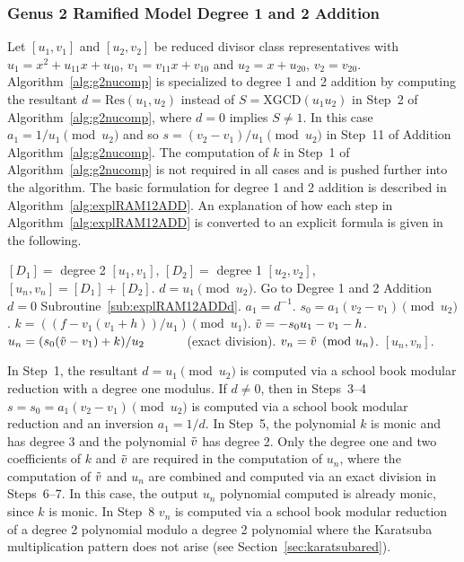 \subsubsection{Genus 2 Ramified Model Degree 1 and 2 Addition}
Let $[u_1,v_1]$ and $[u_2,v_2]$ be reduced divisor class representatives with
$u_1 = x^2 + u_{11}x + u_{10}$, $v_1 = v_{11}x + v_{10}$ and $u_2 = x + u_{20}$,
$v_2 = v_{20}$. Algorithm~\ref{alg:g2nucomp}  is specialized to
degree 1 and 2 addition by computing the resultant $d = \mathrm{Res}(u_1,u_2)$
instead of $S = \mathrm{XGCD}(u_1 u_2)$ in Step~2 of
Algorithm~\ref{alg:g2nucomp}, where $d=0$ implies $S \neq 1$. In this case $a_1
= 1/u_1 \pmod{u_2}$ and so $s = (v_2 - v_1)/u_1 \pmod{u_2}$ in Step~11 of
Addition Algorithm~\ref{alg:g2nucomp}. The computation of $k$ in Step~1 of
Algorithm~\ref{alg:g2nucomp} is not required in all cases and is pushed further
into the algorithm. The basic formulation for degree 1 and 2 addition is
described in Algorithm~\ref{alg:explRAM12ADD}. An explanation of how each step
in Algorithm~\ref{alg:explRAM12ADD} is converted to an explicit formula is given
in the following.

\begin{algorithm}[htbp]
\caption{Genus 2 Ramified Model Degree 1 and 2 Addition\label{alg:explRAM12ADD}}
\begin{algorithmic} [1]
\Require $[D_1] = $ degree 2 $[u_1,v_1]$, $[D_2] = $ degree 1 $ [u_2,v_2]$, \smallskip
\Ensure $[u_n,v_n] = [D_1] + [D_2] $.
\algrule
\State $d = u_1 \pmod{u_2}$.
 \hspace{1pt} Go to Degree 1 and 2 Addition $d=0$ Subroutine~\ref{sub:explRAM12ADDd}.
\EndIf
\State $a_1 = d^{-1}$.
\State $s_0 = a_1(v_2 - v_1) \pmod{u_2}$.
\State $k = ((f - v_1(v_1 + h))/u_1) \pmod{u_1}$.
\State $\tilde{v} = -s_0u_1 - v_1 - h$.
\State $u_n = (s_0(\tilde{v} - v_1) + k)/u_2 \quad\quad\quad$ (exact division).
\State $v_n = \tilde{v} \pmod{u_n}$.
\State \Return $[u_n,v_n]$.
\end{algorithmic}
\end{algorithm}

In Step~1, the resultant $d = u_1 \pmod{u_2}$ is computed via a school book
modular reduction with a degree one modulus. If $d \neq 0$, then in Steps~3--4
$s = s_0 = a_1(v_2 - v_1) \pmod{u_2}$ is computed via a school book modular
reduction and an inversion $a_1 = 1/d$. In Step~5, the polynomial $k$ is monic
and has degree 3 and the polynomial $\tilde{v}$ has degree 2. Only the degree one and two
coefficients of $k$ and $\tilde{v}$ are required in the computation of $u_n$, where
the computation of $\tilde{v}$ and $u_n$ are combined and computed via an exact
division in Steps~6--7. In this case, the output $u_n$ polynomial computed is
already monic, since $k$ is monic. In Step~8 $v_n$ is computed via a school book
modular reduction of a degree 2 polynomial modulo a degree 2 polynomial where
the Karatsuba multiplication pattern does not arise (see
Section~\ref{sec:karatsubared}).


